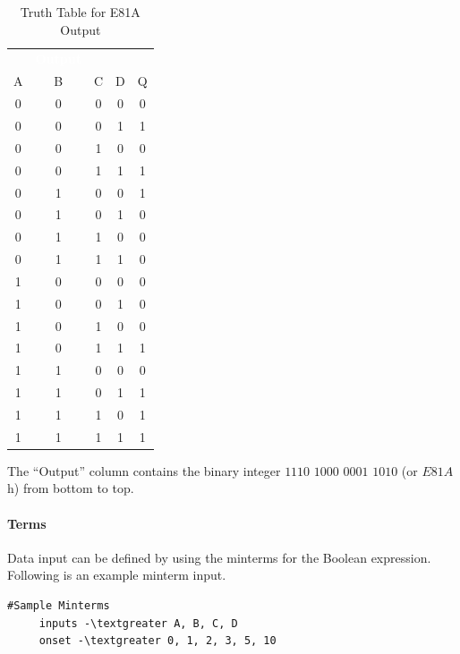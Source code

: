 \begin{table}[H]
	\sffamily
	\newcommand{\head}[1]{\textcolor{white}{\textbf{#1}}}		
	\begin{center}
		\begin{tabular}{ccccc} 
			\rowcolor{black!75}
			\multicolumn{4}{c}{\head{Inputs}} & \head{Output} \\
			A & B & C & D & Q \\
			\hline
			0 & 0 & 0 & 0 & 0 \\
			0 & 0 & 0 & 1 & 1 \\
			0 & 0 & 1 & 0 & 0 \\
			0 & 0 & 1 & 1 & 1 \\
			0 & 1 & 0 & 0 & 1 \\
			0 & 1 & 0 & 1 & 0 \\
			0 & 1 & 1 & 0 & 0 \\
			0 & 1 & 1 & 1 & 0 \\
			1 & 0 & 0 & 0 & 0 \\
			1 & 0 & 0 & 1 & 0 \\
			1 & 0 & 1 & 0 & 0 \\
			1 & 0 & 1 & 1 & 1 \\
			1 & 1 & 0 & 0 & 0 \\
			1 & 1 & 0 & 1 & 1 \\
			1 & 1 & 1 & 0 & 1 \\
			1 & 1 & 1 & 1 & 1 \\
		\end{tabular}
	\end{center}
	\caption{Truth Table for E81A Output}
	\label{tab:e81a_output}
\end{table}

The ``Output'' column contains the binary integer $1110$ $1000$ $0001$ $1010$ (or $E81A$h) from bottom to top.

\paragraph{Terms}

Data input can be defined by using the minterms for the Boolean expression. Following is an example minterm input.

\begin{Verbatim}[commandchars=\\\{\}]
     #Sample Minterms 
     inputs -\textgreater A, B, C, D
     onset -\textgreater 0, 1, 2, 3, 5, 10
\end{Verbatim}

